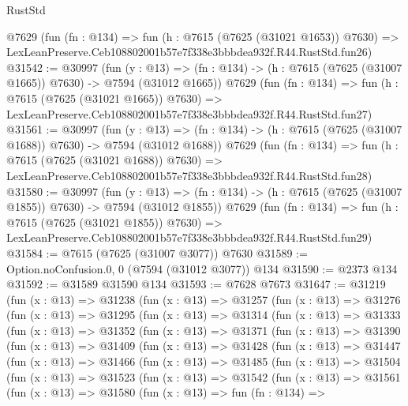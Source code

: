 \begin{lexlean}{RustStd}
\begin{coremodule}
    @7629
    (fun (fn : @134) =>
    fun (h : @7615 (@7625 (@31021 @1653)) @7630) =>
    LexLeanPreserve.Ceb108802001b57e7f338e3bbbdea932f.R44.RustStd.fun26)
@31542 := @30997
    (fun (y : @13) =>
    (fn : @134) -> (h : @7615 (@7625 (@31007 @1665)) @7630) -> @7594 (@31012 @1665))
    @7629
    (fun (fn : @134) =>
    fun (h : @7615 (@7625 (@31021 @1665)) @7630) =>
    LexLeanPreserve.Ceb108802001b57e7f338e3bbbdea932f.R44.RustStd.fun27)
@31561 := @30997
    (fun (y : @13) =>
    (fn : @134) -> (h : @7615 (@7625 (@31007 @1688)) @7630) -> @7594 (@31012 @1688))
    @7629
    (fun (fn : @134) =>
    fun (h : @7615 (@7625 (@31021 @1688)) @7630) =>
    LexLeanPreserve.Ceb108802001b57e7f338e3bbbdea932f.R44.RustStd.fun28)
@31580 := @30997
    (fun (y : @13) =>
    (fn : @134) -> (h : @7615 (@7625 (@31007 @1855)) @7630) -> @7594 (@31012 @1855))
    @7629
    (fun (fn : @134) =>
    fun (h : @7615 (@7625 (@31021 @1855)) @7630) =>
    LexLeanPreserve.Ceb108802001b57e7f338e3bbbdea932f.R44.RustStd.fun29)
@31584 := @7615 (@7625 (@31007 @3077)) @7630
@31589 := Option.noConfusion.{0, 0} (@7594 (@31012 @3077)) @134
@31590 := @2373 @134
@31592 := @31589 @31590 @134
@31593 := @7628 @7673
@31647 := @31219
    (fun (x : @13) =>
    @31238
      (fun (x : @13) =>
      @31257
        (fun (x : @13) =>
        @31276
          (fun (x : @13) =>
          @31295
            (fun (x : @13) =>
            @31314
              (fun (x : @13) =>
              @31333
                (fun (x : @13) =>
                @31352
                  (fun (x : @13) =>
                  @31371
                    (fun (x : @13) =>
                    @31390
                      (fun (x : @13) =>
                      @31409
                        (fun (x : @13) =>
                        @31428
                          (fun (x : @13) =>
                          @31447
                            (fun (x : @13) =>
                            @31466
                              (fun (x : @13) =>
                              @31485
                                (fun (x : @13) =>
                                @31504
                                  (fun (x : @13) =>
                                  @31523
                                    (fun (x : @13) =>
                                    @31542
                                      (fun (x : @13) =>
                                      @31561
                                        (fun (x : @13) =>
                                        @31580
                                          (fun (x : @13) =>
                                          fun (fn : @134) =>

\end{coremodule}
\end{lexlean}
